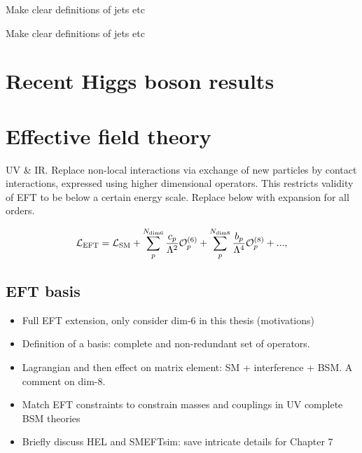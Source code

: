 \begin{table}[htb!]
    \caption[VH leptonic STXS stage 1.2 definitions and fractions]{Make clear definitions of jets etc}
    \label{tab:vh_definitions}
    \centering
    \scriptsize
    \renewcommand{\arraystretch}{1.2}
    \setlength{\tabcolsep}{5pt}
    \hspace*{-5cm}
    
    \hspace*{-5cm}
\end{table}

\begin{table}[htb!]
    \caption[Top-associated and bbH STXS stage 1.2 definitions and fractions]{Make clear definitions of jets etc}
    \label{tab:top_definitions}
    \centering
    \scriptsize
    \renewcommand{\arraystretch}{1.5}
    \setlength{\tabcolsep}{5pt}
    \hspace*{-5cm}
    
    \hspace*{-5cm}
\end{table}

\section{Recent Higgs boson results}

\section{Effective field theory}\label{sec:theory_eft}

UV & IR. Replace non-local interactions via exchange of new particles by contact interactions, expressed using higher dimensional operators. This restricts validity of EFT to be below a certain energy scale. Replace below with expansion for all orders.

\begin{equation}\label{eq:eft_expansion}
    \mathcal{L}_{\rm{EFT}} = \mathcal{L}_{\rm{SM}} + \sum^{N_{\rm{dim6}}}_p \frac{c_p}{\Lambda^2}\mathcal{O}^{(6)}_p + \sum^{N_{\rm{dim8}}}_p \frac{b_p}{\Lambda^4}\mathcal{O}^{(8)}_p + ... ,
\end{equation}

\subsection{EFT basis}
\begin{itemize}
    \item Full EFT extension, only consider dim-6 in this thesis (motivations)
    \item Definition of a basis: complete and non-redundant set of operators.
    \item Lagrangian and then effect on matrix element: SM + interference + BSM. A comment on dim-8.
    \item Match EFT constraints to constrain masses and couplings in UV complete BSM theories
    \item Briefly discuss HEL and SMEFTsim: save intricate details for Chapter 7
\end{itemize}